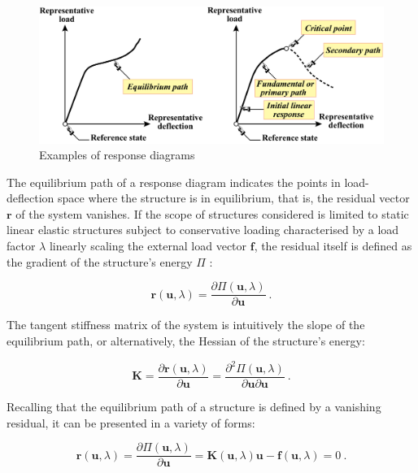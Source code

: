 \begin{figure}[H]
	\centering
	\def\svgwidth{\columnwidth}
	\includegraphics[width=12cm]{images/stability_response_diagram.png}
	\caption{Examples of response diagrams \cite{FelippaNFEMTour2016}}
	\label{stab0}
\end{figure}

The equilibrium path of a response diagram indicates the points in load-deflection space where the structure is in equilibrium, that is, the residual vector $\mathbf{r}$ of the system vanishes. If the scope of structures considered is limited to static linear elastic structures subject to conservative loading characterised by a load factor $\lambda$ linearly scaling the external load vector $\mathbf{f}$, the residual itself is defined as the gradient of the structure's energy $\Pi$ \cite{FelippaNFEMCrit2016}:

\begin{equation}
\mathbf{r}(\mathbf{u},\lambda) = \frac{\partial \Pi (\mathbf{u},\lambda)}{\partial \mathbf{u}}
\label{eqstab0}\ .
\end{equation}

The tangent stiffness matrix of the system is intuitively the slope of the equilibrium path, or alternatively, the Hessian of the structure's energy:

\begin{equation} 
\mathbf{K} = 
\frac{\partial \mathbf{r} (\mathbf{u},\lambda)}{\partial \mathbf{u}} = 
\frac{\partial^2 \Pi (\mathbf{u},\lambda)}{\partial \mathbf{u}\partial \mathbf{u}}
\label{eqstab01}\ .
\end{equation}

Recalling that the equilibrium path of a structure is defined by a vanishing residual, it can be presented in a variety of forms:

\begin{equation} 
\mathbf{r}(\mathbf{u},\lambda) = 
\frac{\partial \Pi (\mathbf{u},\lambda)}{\partial \mathbf{u}} =
\mathbf{K}(\mathbf{u},\lambda) \mathbf{u} - \mathbf{f}(\mathbf{u},\lambda) =
0
\label{eqstab02}\ .
\end{equation}

